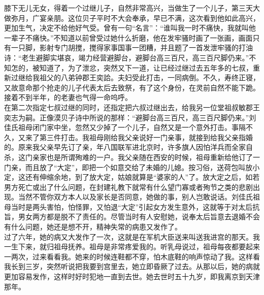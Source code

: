 膝下无儿无女，得着一个过继儿子，自然非常高兴，当做生了一个儿子，第三天大做弥月，广宴亲朋。这位贝子平时不大会奉承，早已不满，这次看到他如此高兴，更加生气，决定不给他好气受。曾有一句“名言”：“谁叫我一时不痛快，我就叫他一辈子不痛快。”不知道以前曾受过她什么折磨，他在发牢骚时画了一张画，画面只有一只脚，影射专门胡搅，搅得家事国事一团糟，并且题了一首发泄牢骚的打油诗：“老生避脚实堪哀，竭力经营避脚台，避脚台高三百尺，高三百尺脚仍来。”不知怎的，被知道了，为了泄忿，突然又下一道，让已经过继过去五年多的七叔，重新过继给我祖父的八弟钟郡王奕詥。夫妇受此打击，一同病倒。不久，寿终正寝，又故意命那个抢走的儿子代表太后去致祭，有了这个身份，在灵前自然不能下跪。接着不到半年，的老妻也气得一命呜呼。\\

在第二次指定七叔过继的同时，还指定把六叔过继出去，给我另一位堂祖叔敏郡王奕志为嗣。正像漠贝子诗中所说的那样：“避脚台高三百尺，高三百尺脚仍来。”刘佳氏祖母闭门家中坐，忽然又少掉了一个儿子，自然又是一个意外打击。事隔不久，又来了第三件打击。我祖母刚给我父亲说好一门亲事，就接到给我父亲指婚的。原来我父亲早先订了亲，年八国联军进北京时，许多旗人因怕洋兵而全家自杀，这门亲家也是所谓殉难的一户。我父亲随在西安的时候，祖母重新给他订了一门亲，而且放了“大定”，即把一个如意交给了未婚的儿媳。按习俗，送荷包叫放小定，这还有伸缩余地，到了放大定，姑娘就算是“婆家的人”了。放大定之后，如若男方死亡或出了什么问题，在封建礼教下就常有什么望门寡或者殉节之类的悲剧出现。当然不管你双方本人以及家长是否同意，她做的事，别人岂敢说话。刘佳氏祖母当时是两头害怕，怕怪罪，又怕退“大定”引起女方发生意外，这就等于对太后抗旨，男女两方都是脱不了责任的。尽管当时有人安慰她，说奉太后旨意去退婚不会有什么问题，她还是想不开，精神失常的病患又发作了。\\

过了六年，她的病又大发作了一次，这就是在军机大臣送来叫送我进宫的那天。我一生下来，就归祖母抚养。祖母是非常疼爱我的。听乳母说过，祖母每夜都要起来一两次，过来看看我。她来的时候连鞋都不穿，怕木底鞋的响声惊动了我。这样看我长到三岁，突然听说把我要到宫里去，她立即昏厥了过去。从那以后，她的病就更加容易发作，这样时好时犯地一直到去世。她去世时五十九岁，即我离京到天津那年。\\

